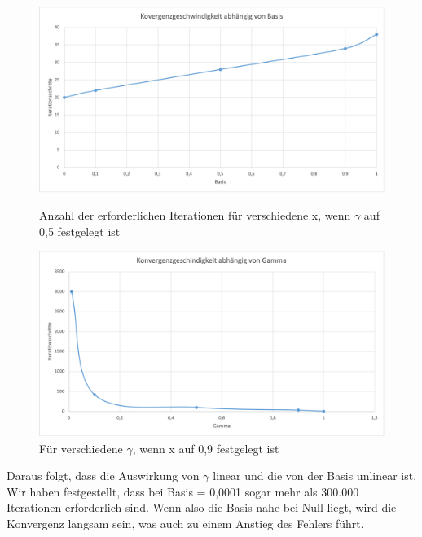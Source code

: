 \documentclass[course=erap]{aspdoc}
\begin{document}
\begin{figure}[h]
    \begin{minipage}{\textwidth}
        \centering
        \includegraphics[width=0.65\linewidth]{Bilder/KonvergenzBasis.png}
        \caption{Anzahl der erforderlichen Iterationen für verschiedene x, wenn $\gamma$ auf 0,5 festgelegt ist}
        \label{fig:xchange}
    \end{minipage}
    \begin{minipage}{\textwidth}
        \centering
        \includegraphics[width=0.65\linewidth]{Bilder/KonvergenzGamma.png}
        \caption{Für verschiedene $\gamma$, wenn x auf 0,9 festgelegt ist}
        \label{fig:gammachange}
    \end{minipage}
\end{figure}

    
\par
Daraus folgt, dass die Auswirkung von $\gamma$ linear und die von der Basis unlinear ist. Wir haben festgestellt, dass bei Basis = 0,0001 sogar mehr als 300.000 Iterationen erforderlich sind. Wenn also die Basis nahe bei Null liegt, wird die Konvergenz langsam sein, was auch zu einem Anstieg des Fehlers führt.
\end{document}

